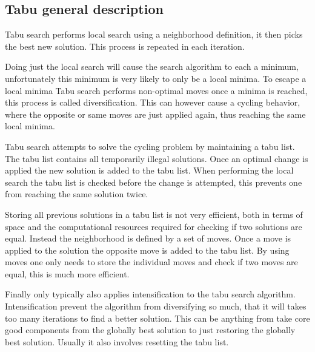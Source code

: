 \subsection{Tabu general description}

Tabu search performs local search using a neighborhood definition, it then picks the best new solution. This process is repeated in each iteration.

Doing just the local search will cause the search algorithm to each a minimum, unfortunately this minimum is very likely to only be a local minima. To escape a local minima Tabu search performs non-optimal moves once a minima is reached, this process is called diversification. This can however cause a cycling behavior, where the opposite or same moves are just applied again, thus reaching the same local minima.

Tabu search attempts to solve the cycling problem by maintaining a tabu list. The tabu list contains all temporarily illegal solutions. Once an optimal change is applied the new solution is added to the tabu list. When performing the local search the tabu list is checked before the change is attempted, this prevents one from reaching the same solution twice.

Storing all previous solutions in a tabu list is not very efficient, both in terms of space and the computational resources required for checking if two solutions are equal. Instead the neighborhood is defined by a set of moves. Once a move is applied to the solution the opposite move is added to the tabu list. By using moves one only needs to store the individual moves and check if two moves are equal, this is much more efficient.

Finally only typically also applies intensification to the tabu search algorithm. Intensification prevent the algorithm from diversifying so much, that it will takes too many iterations to find a better solution. This can be anything from take core good components from the globally best solution to just restoring the globally best solution. Usually it also involves resetting the tabu list.

